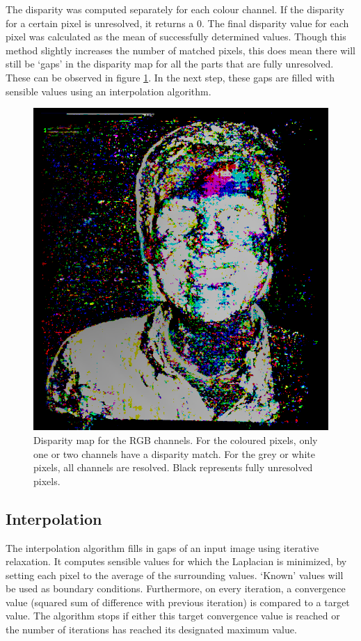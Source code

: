 \documentclass[journal]{IEEEtran}
\begin{document}
The disparity was computed separately for each colour channel. If the disparity for a certain pixel is unresolved, it returns a 0. The final disparity value for each pixel was calculated as the mean of successfully determined values. Though this method slightly increases the number of matched pixels, this does mean there will still be `gaps' in the disparity map for all the parts that are fully unresolved. These can be observed in figure \ref{fig:disparity-rgb}. In the next step, these gaps are filled with sensible values using an interpolation algorithm.

\begin{figure}[t]
    \centering
    \includegraphics[width=0.6\linewidth]{Pics/disparity-RGB.png}
    \caption{Disparity map for the RGB channels. For the coloured pixels, only one or two channels have a disparity match. For the grey or white pixels, all channels are resolved. Black represents fully unresolved pixels.}
    \label{fig:disparity-rgb}
\end{figure}


\subsection{Interpolation}
The interpolation algorithm fills in gaps of an input image using iterative relaxation. It computes sensible values for which the Laplacian is minimized, by setting each pixel to the average of the surrounding values. `Known' values will be used as boundary conditions. Furthermore, on every iteration, a convergence value (squared sum of difference with previous iteration) is compared to a target value. The algorithm stops if either this target convergence value is reached or the number of iterations has reached its designated maximum value.
\end{document}

